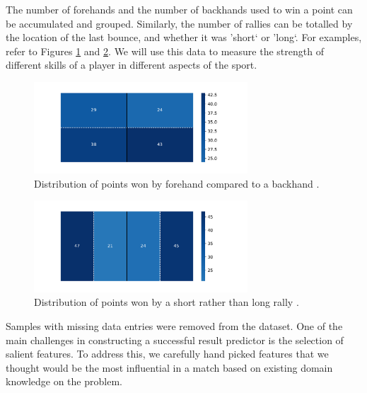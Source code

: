 The number of forehands and the number of backhands used to win a point can be accumulated and grouped. Similarly, the number of rallies can be totalled by the location of the last bounce, and whether it was 'short` or 'long`. For examples, refer to Figures \ref{fvbh} and \ref{svlr}. We will use this data to measure the strength of different skills of a player in different aspects of the sport.

\begin{figure}[ht]
\centering

\includegraphics[width=8cm]{plots/forehandvsbackhand.pdf}
\caption{Distribution of points won by forehand compared to a backhand \cite{OSAI}.}

\label{fvbh}
\end{figure}

\begin{figure}[ht]
\centering

\includegraphics[width=8cm]{plots/shortvslongrally.pdf}
\caption{Distribution of points won by a short rather than long rally \cite{OSAI}.}

\label{svlr}
\end{figure}


 Samples with missing data entries were removed from the dataset. One of the main challenges in constructing a successful result predictor is the selection of salient features. To address this, we carefully hand picked features that we thought would be the most influential in a match based on existing domain knowledge on the problem.